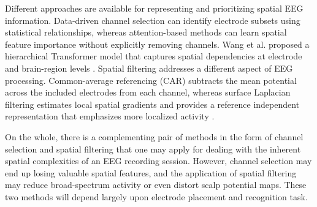 \documentclass[ASNA,twocolumn]{USG}
\begin{document}
Different approaches are available for representing and prioritizing spatial EEG information. Data-driven channel selection can identify electrode subsets using statistical relationships, whereas attention-based methods can learn spatial feature importance without explicitly removing channels. Wang et al. proposed a hierarchical Transformer model that captures spatial dependencies at electrode and brain-region levels \cite{wang2022transformers}. Spatial filtering addresses a different aspect of EEG processing. Common-average referencing (CAR) subtracts the mean potential across the included electrodes from each channel, whereas surface Laplacian filtering estimates local spatial gradients and provides a reference independent representation that emphasizes more localized activity \cite{kayser2015issues}.

On the whole, there is a complementing pair of methods in the form of channel selection and spatial filtering that one may apply for dealing with the inherent spatial complexities of an EEG recording session. However, channel selection may end up losing valuable spatial features, and the application of spatial filtering may reduce broad-spectrum activity or even distort scalp potential maps. These two methods will depend largely upon electrode placement and recognition task.
\end{document}
